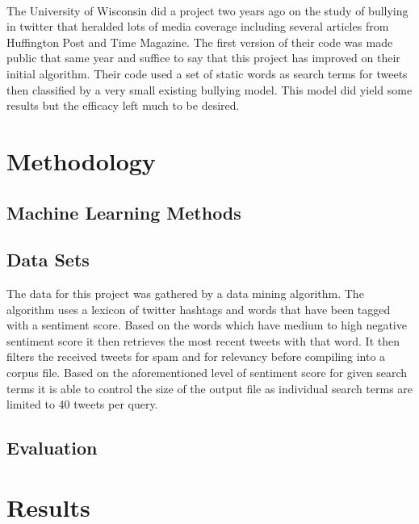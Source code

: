 \documentclass[11pt,letterpaper]{article}
\begin{document}
\paragraph{}
The University of Wisconsin did a project two years ago on the study of bullying in twitter that heralded lots of media coverage including several articles from Huffington Post and Time Magazine. The first version of their code was made public that same year and suffice to say that this project has improved on their initial algorithm. Their code used a set of static words as search terms for tweets then classified by a very small existing bullying model. This model did yield some results but the efficacy left much to be desired.

\section{Methodology}

\subsection{Machine Learning Methods}
\subsection{Data Sets}
The data for this project was gathered by a data mining algorithm. The algorithm uses a lexicon of twitter hashtags and words that have been tagged with a sentiment score. Based on the words which have medium to high negative sentiment score it then retrieves the most recent tweets with that word. It then filters the received tweets for spam and for relevancy before compiling into a corpus file. Based on the aforementioned level of sentiment score for given search terms it is able to control the size of the output file as individual search terms are limited to 40 tweets per query.
\subsection{Evaluation}

\section{Results}
\end{document}

